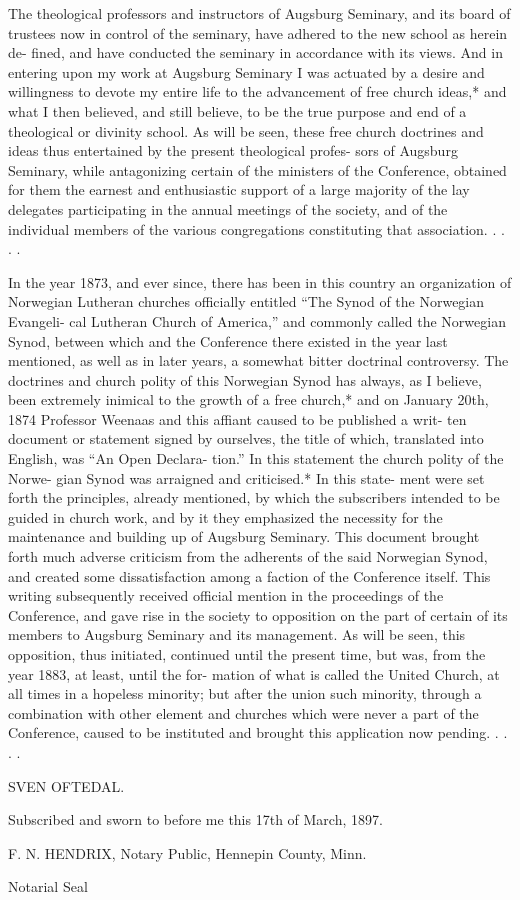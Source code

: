 The theological professors and instructors of Augsburg
Seminary, and its board of trustees now in control of the
seminary, have adhered to the new school as herein de-
fined, and have conducted the seminary in accordance with
its views. And in entering upon my work at Augsburg
Seminary I was actuated by a desire and willingness to
devote my entire life to the advancement of free church
ideas,* and what I then believed, and still believe, to be
the true purpose and end of a theological or divinity
school. As will be seen, these free church doctrines and
ideas thus entertained by the present theological profes-
sors of Augsburg Seminary, while antagonizing certain of
the ministers of the Conference, obtained for them the
earnest and enthusiastic support of a large majority of the
lay delegates participating in the annual meetings of the
society, and of the individual members of the various
congregations constituting that association. . . . .

In the year 1873, and ever since, there has been in this
country an organization of Norwegian Lutheran churches
officially entitled “The Synod of the Norwegian Evangeli-
cal Lutheran Church of America,” and commonly called
the Norwegian Synod, between which and the Conference
there existed in the year last mentioned, as well as in later
years, a somewhat bitter doctrinal controversy. The
doctrines and church polity of this Norwegian Synod has
always, as I believe, been extremely inimical to the growth
of a free church,* and on January 20th, 1874 Professor
Weenaas and this affiant caused to be published a writ-
ten document or statement signed by ourselves, the title
of which, translated into English, was “An Open Declara-
tion.” In this statement the church polity of the Norwe-
gian Synod was arraigned and criticised.* In this state-
ment were set forth the principles, already mentioned, by
which the subscribers intended to be guided in church
work, and by it they emphasized the necessity for the
maintenance and building up of Augsburg Seminary. This
document brought forth much adverse criticism from the
adherents of the said Norwegian Synod, and created some
dissatisfaction among a faction of the Conference itself.
This writing subsequently received official mention in the
proceedings of the Conference, and gave rise in the society
to opposition on the part of certain of its members to
Augsburg Seminary and its management. As will be seen,
this opposition, thus initiated, continued until the present
time, but was, from the year 1883, at least, until the for-
mation of what is called the United Church, at all times
in a hopeless minority; but after the union such minority,
through a combination with other element and churches
which were never a part of the Conference, caused to be
instituted and brought this application now pending. . . . .

SVEN OFTEDAL.

Subscribed and sworn to before me this 17th of March,
1897.

F. N. HENDRIX,
Notary Public, Hennepin County, Minn.

Notarial Seal